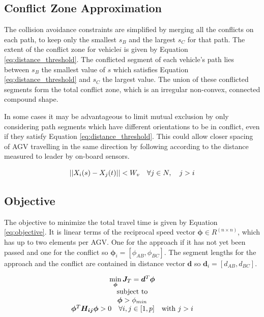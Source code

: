 \subsection{Conflict Zone Approximation}
\label{sec:conflict_zone}
The collision avoidance constraints are simplified by merging all the conflicts on each path, to keep only the smallest $s_B$ and the largest $s_C$ for that path. The extent of the conflict zone for vehicle$i$ is given by Equation \ref{eq:distance_threshold}. The conflicted segment of each vehicle's path lies between $s_B$ the smallest value of $s$ which satisfies Equation \ref{eq:distance_threshold} and $s_C$ the largest value. The union of these conflicted segments form the total conflict zone, which is an irregular non-convex, connected compound shape. 

In some cases it may be advantageous to limit mutual exclusion by only considering path segments which have different orientations to be in conflict, even if they satisfy Equation \ref{eq:distance_threshold}. This could allow closer spacing of AGV travelling in the same direction by following according to the distance measured to leader by on-board sensors.

\begin{equation}
\label{eq:distance_threshold}
||X_i(s) - X_j(t)|| < W_v \quad \forall j \in N, \quad j>i\\
\end{equation}

\subsection{Objective}
The objective to minimize the total travel time is given by Equation \ref{eq:objective}. It is linear terms of the reciprocal speed vector $\bm{\phi} \in R^{(n \times n)}$, which has up to two elements per AGV. One for the approach if it has not yet been passed and one for the conflict so $\bm{\phi}_i = [\phi_{AB}, \phi_{BC}]$. The segment lengths for the approach and the conflict are contained in distance vector $\bm{d}$ so $\bm{d}_i =[d_{AB}, d_{BC}] $.

\begin{equation}
\label{eq:objective}
\begin{array}{c}
\min \limits_{\bm{\phi}} \bm{J}_T = \bm{d}^T\bm{\phi} \\ 
$subject to$\\
\bm{\phi} > \phi_{min} \\
\bm{\phi}^T \bm{H_{ij}} \bm{\phi} > 0 \quad \forall i, j \in [1,p] \quad $with $ j > i \\
\end{array}
\end{equation}

